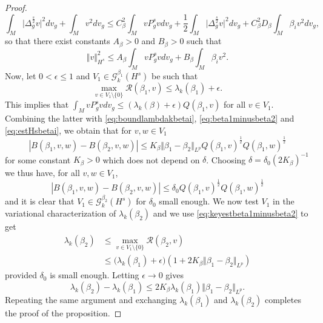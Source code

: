 \documentclass[10pt]{amsart}
\numberwithin{equation}{section}
\def\ep{{\varepsilon}}
\def \ep{\epsilon}
\theoremstyle{plain}
\theoremstyle{remark}
\begin{document}
\begin{proof}
$$ \int_M \vert \Delta_g^{\frac{s}{2}} v \vert^2 dv_g + \int_M v^2 dv_g \leq C_\beta^2 \int_M v P_g^s v dv_g + \frac{1}{2} \int_M \vert \Delta_g^{\frac{s}{2}} v \vert^2 dv_g + C_\beta^2 D_\beta \int_M \beta_i v^2dv_g,  $$
so that there exist constants $A_\beta>0 $ and $B_\beta>0$ such that
\begin{equation} \label{eq:estHsbetai} \Vert v \Vert_{H^s}^2 \leq A_\beta \int_M v P_g^s v dv_g + B_\beta \int_M \beta_i v^2. \end{equation}
Now, let $0<\ep \leq 1$ and $V_1 \in \mathcal{G}_k^{\beta_1}(H^s)$ be such that
$$ \max_{v\in V_1 \setminus\{0\}} \mathcal{R}(\beta_1,v) \leq \lambda_k(\beta_1) + \ep.  $$
This implies that $\int_M v P_g^s v dv_g \le (\lambda_k(\beta) + \ep) Q(\beta_1, v)$ for all $v \in V_1$. Combining the latter with \eqref{eq:boundlambdakbetai}, \eqref{eq:beta1minusbeta2} and \eqref{eq:estHsbetai}, we obtain that for $v,w \in V_1$
\begin{equation} \label{eq:keyestbeta1minusbeta2} \left\vert B(\beta_1,v,w) - B(\beta_2,v,w) \right\vert
 \leq K_\beta \Vert \beta_1 - \beta_2 \Vert_{L^p} Q(\beta_1,v)^{\frac{1}{2}}Q(\beta_1,w)^{\frac{1}{2}} \end{equation}
 for some constant $K_\beta >0$ which does not depend on $\delta$.
 Choosing $\delta = \delta_0 (2K_\beta)^{-1}$ we thus have, for all $v,w \in V_1$,
\begin{equation*}
\left\vert B(\beta_1,v,w) - B(\beta_2,v,w) \right\vert \leq \delta_0 Q(\beta_1,v)^{\frac{1}{2}}Q(\beta_1,w)^{\frac{1}{2}} \end{equation*}
and it is clear that $V_1 \in \mathcal{G}_k^{\beta_2}(H^s)$ for $\delta_0$ small enough. We now test $V_1$ in the variational characterization of $\lambda_k(\beta_2)$ and we use \eqref{eq:keyestbeta1minusbeta2} to get
\begin{equation*}
\begin{split} \lambda_k(\beta_2) & \leq \max_{v\in V_1 \setminus\{0\}} \mathcal{R}(\beta_2,v) %
\\ & \leq \big(\lambda_k(\beta_1) + \ep \big) \left(1 + 2 K_\beta \Vert \beta_1 - \beta_2 \Vert_{L^p}\right) \end{split} \end{equation*}
provided $\delta_0$ is small enough.  Letting $\ep \to 0$ gives 
$$ \lambda_k(\beta_2) - \lambda_k(\beta_1) \le  2 K_\beta \lambda_k(\beta_1)\Vert \beta_1 - \beta_2 \Vert_{L^p}.$$ 
Repeating the same argument and exchanging $\lambda_k(\beta_1)$ and $\lambda_k(\beta_2)$ completes the proof of the proposition.
\end{proof}
\end{document}
